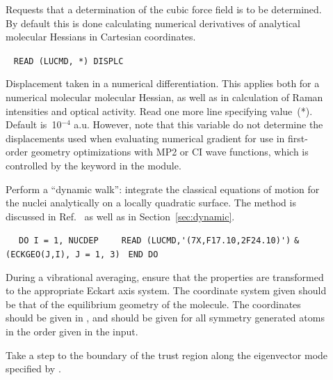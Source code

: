 \begin{description}
\item[]
Requests that a determination of the cubic force field is to be determined.
By default this is done calculating numerical derivatives of analytical
molecular Hessians in Cartesian coordinates.

\item[]\verb| |\newline
\verb|READ (LUCMD, *) DISPLC|

Displacement taken in a numerical differentiation. This applies both for a numerical molecular
molecular Hessian, as well as in calculation of Raman
intensities and optical activity.
Read one more
line specifying value~(*).  Default is~10$^{-4}$ a.u. However,
note that this variable do not determine the displacements used
when evaluating numerical gradient for use in first-order geometry
optimizations with MP2 or CI wave
functions, which is controlled by the  keyword in the
 module.

\item[]
Perform a ``dynamic walk'': integrate the
classical equations of motion for the nuclei
analytically on a locally
quadratic surface. The method is discussed in
Ref.~\cite{theuhjajcpl173} as well as in Section~\ref{sec:dynamic}.

\item[]\verb| |\newline
\verb| DO I = 1, NUCDEP|\newline
\verb|    READ (LUCMD,'(7X,F17.10,2F24.10)')|\newline
\verb|&        (ECKGEO(J,I), J = 1, 3)|\newline
\verb| END DO|

During a vibrational averaging, ensure that the properties are
transformed to the appropriate Eckart axis system.  The coordinate
system given should be that of the equilibrium geometry of the
molecule. The coordinates should be given in \bohr{}, and should be given
for all symmetry generated atoms in the order given in the input.

\item[] Take a step to the boundary of the trust
region
along the eigenvector mode specified by .


\end{description}
